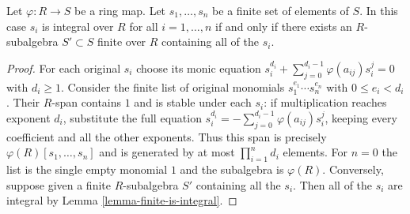 \begin{lemma}
\label{lemma-characterize-integral}
Let $\varphi : R \to S$ be a ring map. Let $s_1, \ldots, s_n$
be a finite set of elements of $S$.
In this case $s_i$ is integral over $R$ for all $i = 1, \ldots, n$
if and only if
there exists an $R$-subalgebra $S' \subset S$ finite over $R$
containing all of the $s_i$.
\end{lemma}

\begin{proof}
For each original $s_i$ choose its monic equation
$s_i^{d_i}+\sum_{j=0}^{d_i-1}\varphi(a_{ij})s_i^j=0$ with
$d_i\geq1$. Consider the finite list of original monomials
$s_1^{e_1}\cdots s_n^{e_n}$ with $0\leq e_i<d_i$.
Their $R$-span contains $1$ and is stable under each $s_i$:
if multiplication reaches exponent $d_i$, substitute the full equation
$s_i^{d_i}=-\sum_{j=0}^{d_i-1}\varphi(a_{ij})s_i^j$, keeping every
coefficient and all the other exponents. Thus this span is precisely
$\varphi(R)[s_1,\ldots,s_n]$ and is generated by at most
$\prod_{i=1}^n d_i$ elements. For $n=0$ the list is the single
empty monomial $1$ and the subalgebra is $\varphi(R)$.
Conversely, suppose given a finite $R$-subalgebra
$S'$ containing all the $s_i$. Then all of the
$s_i$ are integral by Lemma \ref{lemma-finite-is-integral}.
\end{proof}
